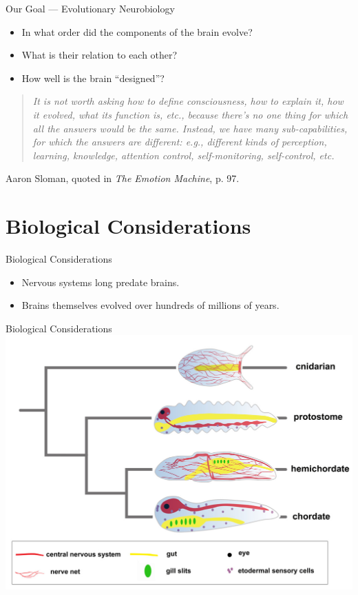 \documentclass{beamer}
\begin{document}
   \begin{frame}{Our Goal --- Evolutionary Neurobiology}
      
      \begin{itemize}
         \item In what order did the components of the brain evolve?
         \item What is their relation to each other?
         \item How well is the brain ``designed''?
      \end{itemize}
      
      \pause
      
      \begin{quote}\emph{
            It is not worth asking how to define consciousness, how to explain it, how it
            evolved, what its function is, etc., because there’s no one thing for which all
            the answers would be the same. Instead, we have many sub-capabilities, for
            which the answers are different: e.g., different kinds of perception, learning,
            knowledge, attention control, self-monitoring, self-control, etc.
         }\end{quote}

         Aaron Sloman, quoted in \emph{The Emotion Machine}, p. 97.
         \end{frame}
   
   \section{Biological Considerations}
   
   \begin{frame}{Biological Considerations}
      \begin{itemize}
            \item Nervous systems long predate brains.
            \item Brains themselves evolved over hundreds of millions of years.
      \end{itemize}
   \end{frame}
   
   \begin{frame}{Biological Considerations}
      \includegraphics[width=\textwidth]{../Thesis/Figs/chordata.jpg}
   \end{frame}
\end{document}
